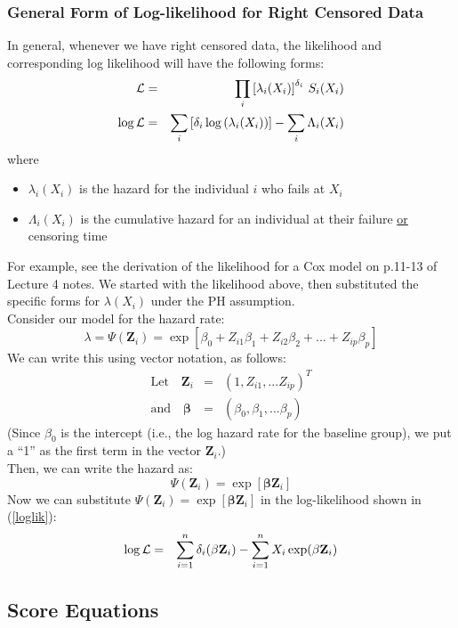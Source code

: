 \documentclass[11pt,psfig]{book}
\newcommand{\bfZ}{\mathbf{Z}}
\newcommand{\bfbeta}{\mathbf{\beta}}
\begin{document}
\subsubsection{General Form of Log-likelihood for Right Censored Data}
In general, whenever we have right censored data, the likelihood and
corresponding log likelihood will have the following forms:
\begin{eqnarray*}
{\cal L} & = &\prod_i \left[\lambda_i(X_i)\right]^{\delta_i} \, S_i(X_i)\\
\log {\cal L} & = &
\sum_i \left[\delta_i \log{(\lambda_i(X_i))}\right] - \sum_i \Lambda_i(X_i)
\end{eqnarray*}
where
\begin{itemize}
\item $\lambda_i(X_i)$ is the hazard for the individual $i$ who
fails at $X_i$
\item $\Lambda_i(X_i)$ is the cumulative hazard for an individual
at their failure \underline{or} censoring time
\end{itemize}
For example, see the derivation of the likelihood for a Cox model on
p.11-13 of Lecture 4 notes.  We started
with the likelihood above, then substituted the specific forms for
$\lambda(X_i)$ under the PH assumption.
\\[2ex]
Consider our model for the hazard rate:
\[\lambda = \Psi(\bfZ_i) =
\exp[ \beta_0 + Z_{i1} \beta_1 + Z_{i2} \beta_2 + ... + Z_{ip} \beta_p] \]
We can write this using vector notation, as follows:
\begin{eqnarray*}
\mbox{Let~~~} \bfZ_i & = & (1,Z_{i1},...Z_{ip})^T \\[1ex]
\mbox{and~~~} \bfbeta & = & (\beta_0, \beta_1,...\beta_p)
\end{eqnarray*}
(Since $\beta_0$ is the intercept (i.e., the log hazard rate for
the baseline group), we put a ``1'' as the first term in the vector
$\bfZ_i$.)
\\[2ex]
Then, we can write the hazard as:
\[    \Psi(\bfZ_i) =   \exp[ \bfbeta \bfZ_i ] \]
Now we can substitute $\Psi(\bfZ_i) = \exp[\bfbeta \bfZ_i]$ in the
log-likelihood shown in (\ref{loglik}):
\begin{eqnarray*}
\log {\cal L} & = &
\sum_{i=1}^{n} {\delta_i} (\bfbeta \bfZ_i) -
\sum_{i=1}^{n} X_i\exp( \bfbeta \bfZ_i )
\end{eqnarray*}
\normalsize

\subsection{Score Equations}
\end{document}
